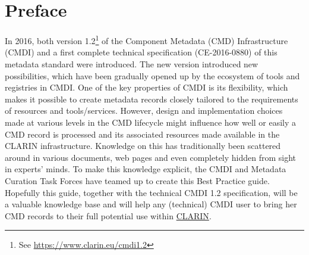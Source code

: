 \section{Preface}
In 2016, both version 1.2\footnote{See \url{https://www.clarin.eu/cmdi1.2}} of
the  Component Metadata (CMD) Infrastructure (CMDI) and a first complete technical specification (CE-2016-0880)  of this metadata standard were introduced. The new version introduced new possibilities, which have been gradually opened up by the ecosystem of tools and registries in CMDI. One of the key properties of CMDI is its flexibility, which makes it possible to create metadata records closely tailored to the requirements of resources and tools/services. However, design and implementation choices made at various levels in the CMD lifecycle might influence how well or easily a CMD record is processed and its associated resources made available in the CLARIN infrastructure. Knowledge on this has traditionally been scattered around in various documents, web pages and even completely hidden from sight in experts' minds. To make this
knowledge explicit, the CMDI and Metadata Curation Task Forces have teamed up to create this Best Practice guide. Hopefully this guide, together with the technical CMDI 1.2 specification, will be a valuable knowledge base and will help any (technical) CMDI user to bring her CMD records to their full potential use within \href{https://www.clarin.eu}{CLARIN}.

